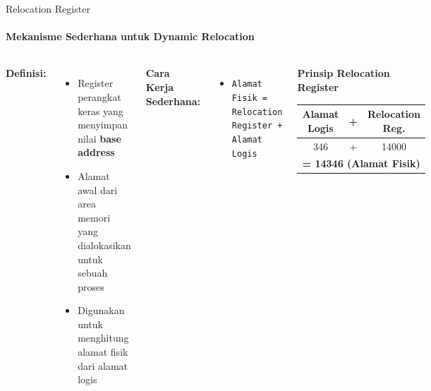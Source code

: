 \documentclass[10pt,aspectratio=169]{beamer}
\begin{document}
\begin{frame}{Relocation Register}
    \framesubtitle{Mekanisme Sederhana untuk Dynamic Relocation}
    
    \begin{columns}[T]
            \textbf{Definisi:}
            \begin{itemize}
                \item Register perangkat keras yang menyimpan nilai \textbf{base address}
                \item Alamat awal dari area memori yang dialokasikan untuk sebuah proses
                \item Digunakan untuk menghitung alamat fisik dari alamat logis
            \end{itemize}
            
            \textbf{Cara Kerja Sederhana:}
            \begin{itemize}
                \item \texttt{Alamat Fisik = Relocation Register + Alamat Logis}
            \end{itemize}
            
            \begin{center}
                \textbf{Prinsip Relocation Register}
                \vspace{0.5cm}
                \begin{tabular}{|c|c|c|}
                    \hline
                    \textbf{Alamat Logis} & \textbf{+} & \textbf{Relocation Reg.} \\
                    \hline
                    346 & + & 14000 \\
                    \hline
                    \multicolumn{3}{|c|}{\textbf{= 14346 (Alamat Fisik)}} \\
                    \hline
                \end{tabular}
            \end{center}
    \end{columns}
\end{frame}
\end{document}
